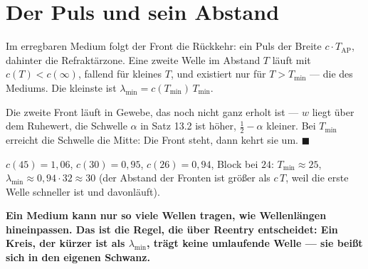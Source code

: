 \section{Der Puls und sein Abstand}

\begin{merksatz}
Im erregbaren Medium folgt der Front die Rückkehr: ein Puls der Breite $c\cdot T_{\mathrm{AP}}$, dahinter die Refraktärzone. Eine zweite Welle im Abstand $T$ läuft mit $c(T) < c(\infty)$, fallend für kleines $T$, und existiert nur für $T > T_{\min}$ --- die  des Mediums. Die kleinste  ist $\lambda_{\min} = c(T_{\min})\,T_{\min}$.

Die zweite Front läuft in Gewebe, das noch nicht ganz erholt ist --- $w$ liegt über dem Ruhewert, die Schwelle $\alpha$ in Satz 13.2 ist höher, $\tfrac12 - \alpha$ kleiner. Bei $T_{\min}$ erreicht die Schwelle die Mitte: Die Front steht, dann kehrt sie um. $\blacksquare$

$c(45) = 1{,}06$, $c(30) = 0{,}95$, $c(26) = 0{,}94$, Block bei $24$: $T_{\min}\approx25$, $\lambda_{\min}\approx 0{,}94\cdot 32 \approx 30$ (der Abstand der Fronten ist größer als $c\,T$, weil die erste Welle schneller ist und davonläuft).

\begin{center}
\begin{minipage}{0.9\textwidth}
\textbf{Ein Medium kann nur so viele Wellen tragen, wie Wellenlängen hineinpassen. Das ist die Regel, die über Reentry entscheidet: Ein Kreis, der kürzer ist als $\lambda_{\min}$, trägt keine umlaufende Welle --- sie beißt sich in den eigenen Schwanz.}
\end{minipage}
\end{center}

\begin{center}
\begin{minipage}{0.88\textwidth}
\end{minipage}
\end{center}
\end{merksatz}

